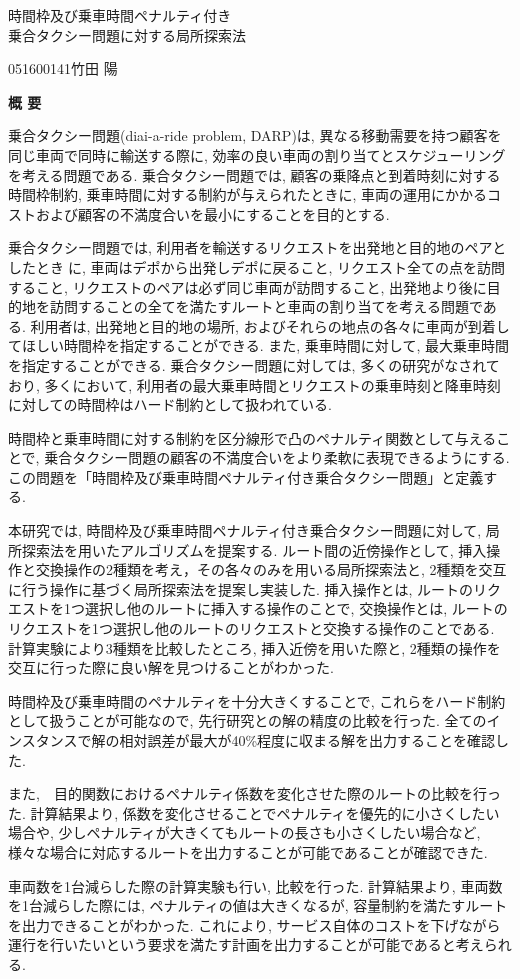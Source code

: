 \begin{center}
{\LARGE 時間枠及び乗車時間ペナルティ付き\\乗合タクシー問題に対する局所探索法}\\[0.5cm]
\end{center}
\hfill
{\large 051600141\qquad 竹田 陽}\\[0.5cm]
\begin{center}
{\Large \bf 概 要}\\
\end{center}


乗合タクシー問題(diai-a-ride problem, DARP)は, 異なる移動需要を持つ顧客を同じ車両で同時に輸送する際に, 効率の良い車両の割り当てとスケジューリングを考える問題である. 乗合タクシー問題では, 顧客の乗降点と到着時刻に対する時間枠制約, 乗車時間に対する制約が与えられたときに, 車両の運用にかかるコストおよび顧客の不満度合いを最小にすることを目的とする.

乗合タクシー問題では, 利用者を輸送するリクエストを出発地と目的地のペアとしたときに, 車両はデポから出発しデポに戻ること, リクエスト全ての点を訪問すること, リクエストのペアは必ず同じ車両が訪問すること, 出発地より後に目的地を訪問することの全てを満たすルートと車両の割り当てを考える問題である. 利用者は, 出発地と目的地の場所, およびそれらの地点の各々に車両が到着してほしい時間枠を指定することができる.
また, 乗車時間に対して, 最大乗車時間を指定することができる.
乗合タクシー問題に対しては, 多くの研究がなされており, 多くにおいて, 利用者の最大乗車時間とリクエストの乗車時刻と降車時刻に対しての時間枠はハード制約として扱われている.

時間枠と乗車時間に対する制約を区分線形で凸のペナルティ関数として与えることで, 乗合タクシー問題の顧客の不満度合いをより柔軟に表現できるようにする. この問題を「時間枠及び乗車時間ペナルティ付き乗合タクシー問題」と定義する.

本研究では, 時間枠及び乗車時間ペナルティ付き乗合タクシー問題に対して, 局所探索法を用いたアルゴリズムを提案する.
ルート間の近傍操作として, 挿入操作と交換操作の2種類を考え，その各々のみを用いる局所探索法と, 2種類を交互に行う操作に基づく局所探索法を提案し実装した.
挿入操作とは, ルートのリクエストを1つ選択し他のルートに挿入する操作のことで, 交換操作とは, ルートのリクエストを1つ選択し他のルートのリクエストと交換する操作のことである.
計算実験により3種類を比較したところ, 挿入近傍を用いた際と, 2種類の操作を交互に行った際に良い解を見つけることがわかった.

時間枠及び乗車時間のペナルティを十分大きくすることで, これらをハード制約として扱うことが可能なので, 先行研究との解の精度の比較を行った. 全てのインスタンスで解の相対誤差が最大が40\%程度に収まる解を出力することを確認した.

また,　目的関数におけるペナルティ係数を変化させた際のルートの比較を行った. 計算結果より, 係数を変化させることでペナルティを優先的に小さくしたい場合や, 少しペナルティが大きくてもルートの長さも小さくしたい場合など, 様々な場合に対応するルートを出力することが可能であることが確認できた.

車両数を1台減らした際の計算実験も行い, 比較を行った. 計算結果より, 車両数を1台減らした際には, ペナルティの値は大きくなるが, 容量制約を満たすルートを出力できることがわかった. これにより, サービス自体のコストを下げながら運行を行いたいという要求を満たす計画を出力することが可能であると考えられる.
